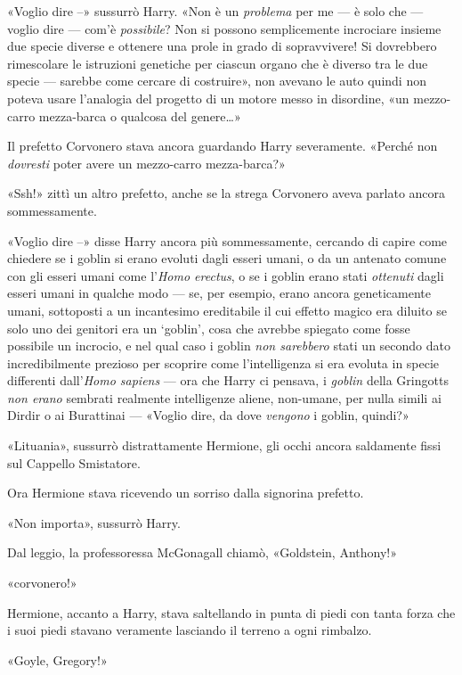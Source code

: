 «Voglio dire –» sussurrò Harry. «Non è un \textit{problema} per me — è solo che — voglio dire — com’è \textit{possibile}? Non si possono semplicemente incrociare insieme due specie diverse e ottenere una prole in grado di sopravvivere! Si dovrebbero rimescolare le istruzioni genetiche per ciascun organo che è diverso tra le due specie — sarebbe come cercare di costruire», non avevano le auto quindi non poteva usare l’analogia del progetto di un motore messo in disordine, «un mezzo-carro mezza-barca o qualcosa del genere…»

Il prefetto Corvonero stava ancora guardando Harry severamente. «Perché non \textit{dovresti} poter avere un mezzo-carro mezza-barca?»

«Ssh!» zittì un altro prefetto, anche se la strega Corvonero aveva parlato ancora sommessamente.

«Voglio dire –» disse Harry ancora più sommessamente, cercando di capire come chiedere se i goblin si erano evoluti dagli esseri umani, o da un antenato comune con gli esseri umani come l’\textit{Homo erectus}, o se i goblin erano stati \textit{ottenuti} dagli esseri umani in qualche modo — se, per esempio, erano ancora geneticamente umani, sottoposti a un incantesimo ereditabile il cui effetto magico era diluito se solo uno dei genitori era un ‘goblin’, cosa che avrebbe spiegato come fosse possibile un incrocio, e nel qual caso i goblin \textit{non sarebbero} stati un secondo dato incredibilmente prezioso per scoprire come l’intelligenza si era evoluta in specie differenti dall’\textit{Homo sapiens} — ora che Harry ci pensava, i \textit{goblin} della Gringotts \textit{non erano} sembrati realmente intelligenze aliene, non-umane, per nulla simili ai Dirdir o ai Burattinai — «Voglio dire, da dove \textit{vengono} i goblin, quindi?»

«Lituania», sussurrò distrattamente Hermione, gli occhi ancora saldamente fissi sul Cappello Smistatore.

Ora Hermione stava ricevendo un sorriso dalla signorina prefetto.

«Non importa», sussurrò Harry.

Dal leggio, la professoressa McGonagall chiamò, «Goldstein, Anthony!»

«corvonero!»

Hermione, accanto a Harry, stava saltellando in punta di piedi con tanta forza che i suoi piedi stavano veramente lasciando il terreno a ogni rimbalzo.

«Goyle, Gregory!»

